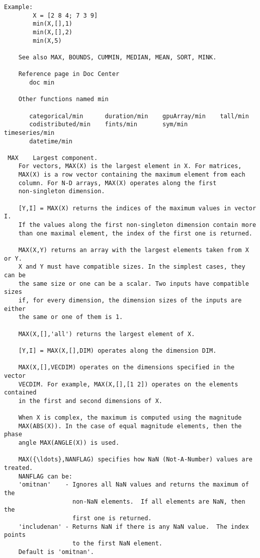 \documentclass[11pt]{article}
\begin{document}
\begin{Verbatim}[commandchars=\\\{\}]
    Example: 
        X = [2 8 4; 7 3 9]
        min(X,[],1)
        min(X,[],2)
        min(X,5)
 
    See also MAX, BOUNDS, CUMMIN, MEDIAN, MEAN, SORT, MINK.

    Reference page in Doc Center
       doc min

    Other functions named min

       categorical/min      duration/min    gpuArray/min    tall/min
       codistributed/min    fints/min       sym/min         timeseries/min
       datetime/min

 MAX    Largest component.
    For vectors, MAX(X) is the largest element in X. For matrices,
    MAX(X) is a row vector containing the maximum element from each
    column. For N-D arrays, MAX(X) operates along the first
    non-singleton dimension.
 
    [Y,I] = MAX(X) returns the indices of the maximum values in vector I.
    If the values along the first non-singleton dimension contain more
    than one maximal element, the index of the first one is returned.
 
    MAX(X,Y) returns an array with the largest elements taken from X or Y.
    X and Y must have compatible sizes. In the simplest cases, they can be
    the same size or one can be a scalar. Two inputs have compatible sizes
    if, for every dimension, the dimension sizes of the inputs are either
    the same or one of them is 1.
 
    MAX(X,[],'all') returns the largest element of X.
 
    [Y,I] = MAX(X,[],DIM) operates along the dimension DIM.
 
    MAX(X,[],VECDIM) operates on the dimensions specified in the vector 
    VECDIM. For example, MAX(X,[],[1 2]) operates on the elements contained
    in the first and second dimensions of X.
 
    When X is complex, the maximum is computed using the magnitude
    MAX(ABS(X)). In the case of equal magnitude elements, then the phase
    angle MAX(ANGLE(X)) is used.
 
    MAX({\ldots},NANFLAG) specifies how NaN (Not-A-Number) values are treated.
    NANFLAG can be:
    'omitnan'    - Ignores all NaN values and returns the maximum of the 
                   non-NaN elements.  If all elements are NaN, then the
                   first one is returned.
    'includenan' - Returns NaN if there is any NaN value.  The index points
                   to the first NaN element.
    Default is 'omitnan'.
 

\end{Verbatim}
\end{document}
